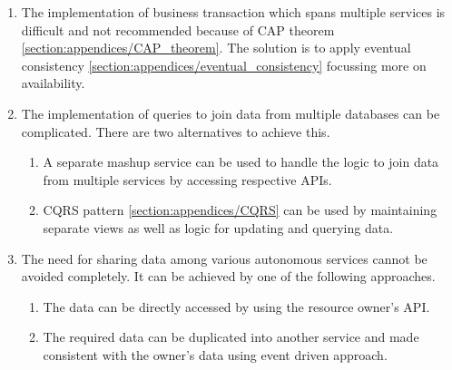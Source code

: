 \begin{enumerate}
\item The implementation of business transaction which spans multiple services is difficult and not recommended because of \acrshort{CAP} theorem \ref{section:appendices/CAP_theorem}. The solution is to apply eventual consistency \ref{section:appendices/eventual_consistency} focussing more on availability.
\item The implementation of queries to join data from multiple databases can be complicated. There are two alternatives to achieve this.
    \begin{enumerate}
        \item A separate mashup service can be used to handle the logic to join data from multiple services by accessing respective \acrshort{API}s.
        \item \acrshort{CQRS} pattern \ref{section:appendices/CQRS} can be used by maintaining separate views as well as logic for updating and querying data.
    \end{enumerate}
\item The need for sharing data among various autonomous services cannot be avoided completely. It can be achieved by one of the following approaches.
    \begin{enumerate}
        \item The data can be directly accessed by using the resource owner's \acrshort{API}.
        \item The required data can be duplicated into another service and made consistent with the owner's data using event driven approach.
    \end{enumerate}
\end{enumerate}

